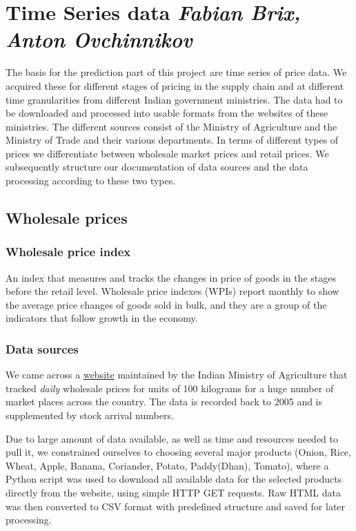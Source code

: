 \section*{Time Series data \footnotesize\emph{Fabian Brix, Anton Ovchinnikov}}
The basis for the prediction part of this project are time series of price data. We acquired these for different stages of pricing in the supply chain and at different time granularities from different Indian government ministries. The data had to be downloaded and processed into usable formats from the websites of these ministries. The different sources consist of the Ministry of Agriculture and the Ministry of Trade and their various departments. In terms of different types of prices we differentiate between wholesale market prices and retail prices. We subsequently structure our documentation of data sources and the data processing according to these two types.

\subsection*{Wholesale prices}

\subsubsection*{Wholesale price index}
An index that measures and tracks the changes in price of goods in the stages before the retail level. Wholesale price indexes (WPIs) report monthly to show the average price changes of goods sold in bulk, and they are a group of the indicators that follow growth in the economy.\par

\subsubsection*{Data sources}
We came across a \href{http://agmarknet.nic.in/}{website} maintained by the Indian Ministry of Agriculture that tracked \emph{daily} wholesale prices for units of 100 kilograms for a huge number of market places across the country. The data is recorded back to 2005 and is supplemented by stock arrival numbers.\par
Due to large amount of data available, as well as time and resources needed to pull it, we constrained ourselves to choosing several major products (Onion, Rice, Wheat, Apple, Banana, Coriander, Potato, Paddy(Dhan), Tomato), where a Python script was used to download all available data for the selected products directly from the website, using simple HTTP GET requests. Raw HTML data was then converted to CSV format with predefined structure and saved for later processing.

